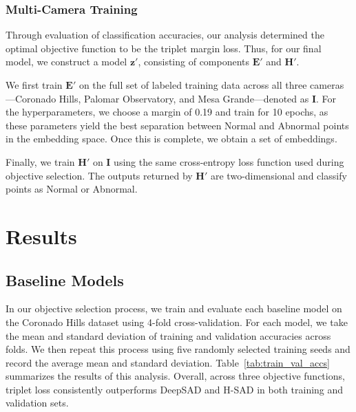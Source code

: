 \documentclass{article}
\begin{document}
\subsubsection{Multi-Camera Training}

Through evaluation of classification accuracies, our analysis determined the optimal objective function to be the triplet margin loss. Thus, for our final model, we construct a model $\mathbf{z'}$, consisting of components $\mathbf{E'}$ and $\mathbf{H'}$.

We first train $\mathbf{E'}$ on the full set of labeled training data across all three cameras—Coronado Hills, Palomar Observatory, and Mesa Grande—denoted as $\mathbf{I}$. For the hyperparameters, we choose a margin of 0.19 and train for 10 epochs, as these parameters yield the best separation between Normal and Abnormal points in the embedding space. Once this is complete, we obtain a set of embeddings. 

Finally, we train $\mathbf{H'}$ on $\mathbf{I}$ using the same cross-entropy loss function used during objective selection. The outputs returned by $\mathbf{H'}$ are two-dimensional and classify points as Normal or Abnormal.

\section{Results}
\label{sec:results}

\subsection{Baseline Models}
In our objective selection process, we train and evaluate each baseline model on the Coronado Hills dataset using 4-fold cross-validation. For each model, we take the mean and standard deviation of training and validation accuracies across folds. We then repeat this process using five randomly selected training seeds and record the average mean and standard deviation. Table~\ref{tab:train_val_accs} summarizes the results of this analysis. Overall, across three objective functions, triplet loss consistently outperforms \ac{DeepSAD} and \ac{H-SAD} in both training and validation sets. 
\end{document}
